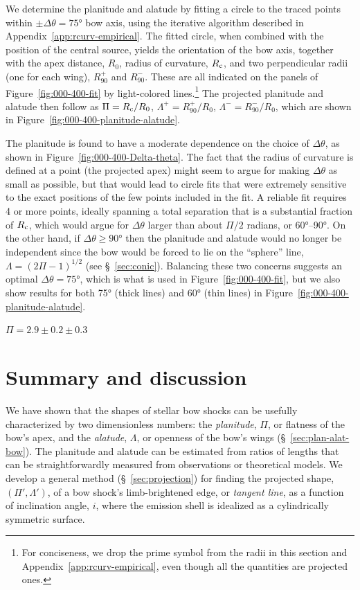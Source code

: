 We determine the planitude and alatude by fitting a circle to the
traced points within \(\pm \Delta\theta = \ang{75}\) bow axis, using the
iterative algorithm described in Appendix~\ref{app:rcurv-empirical}.
The fitted circle, when combined with the position of the central
source, yields the orientation of the bow axis, together with the apex
distance, \(R_0\), radius of curvature, \(R_{\mathrm{c}}\), and two
perpendicular radii (one for each wing), \(R_{90}^+\) and
\(R_{90}^-\).  These are all indicated on the panels of
Figure~\ref{fig:000-400-fit} by light-colored lines.\footnote{%
  For conciseness, we drop the prime symbol from the radii in this
  section and Appendix~\ref{app:rcurv-empirical}, even though all the
  quantities are projected ones.} %
The projected planitude and alatude then follow as \(\Pi = R_{\mathrm{c}}/R_0\),
\(\Lambda^+ = R_{90}^+/R_0\), \(\Lambda^- = R_{90}^-/R_0\), which are shown in Figure~\ref{fig:000-400-planitude-alatude}.

The planitude is found to have a moderate dependence on the choice of
\(\Delta\theta\), as shown in Figure~\ref{fig:000-400-Delta-theta}. The fact
that the radius of curvature is defined at a point (the projected
apex) might seem to argue for making \(\Delta\theta\) as small as possible, but
that would lead to circle fits that were extremely sensitive to the
exact positions of the few points included in the fit.  A reliable fit
requires 4 or more points, ideally spanning a total separation that is
a substantial fraction of \(R_{\mathrm{c}}\), which would argue for
\(\Delta\theta\) larger than about \(\Pi/2\) radians, or \ang{60}--\ang{90}.  On
the other hand, if \(\Delta\theta \ge \ang{90}\) then the planitude and alatude
would no longer be independent since the bow would be forced to lie on
the ``sphere'' line, \(\Lambda = (2 \Pi - 1)^{1/2}\) (see \S~\ref{sec:conic}).
Balancing these two concerns suggests an optimal
\(\Delta\theta = \ang{75}\), which is what is used in
Figure~\ref{fig:000-400-fit}, but we also show results for both
\ang{75} (thick lines) and \ang{60} (thin lines) in
Figure~\ref{fig:000-400-planitude-alatude}.

\(\Pi = 2.9 \pm 0.2 \pm 0.3\)



\section{Summary and discussion}
\label{sec:conc}

We have shown that the shapes of stellar bow shocks can be usefully
characterized by two dimensionless numbers: the \textit{planitude},
\(\Pi\), or flatness of the bow's apex, and the \textit{alatude},
\(\Lambda\), or openness of the bow's wings (\S~\ref{sec:plan-alat-bow}).
The planitude and alatude can be estimated from ratios of lengths that
can be straightforwardly measured from observations or theoretical
models.  We develop a general method (\S~\ref{sec:projection}) for
finding the projected shape, \((\Pi', \Lambda')\), of a bow shock's
limb-brightened edge, or \textit{tangent line}, as a function of
inclination angle, \(i\), where the emission shell is idealized as a
cylindrically symmetric surface.

